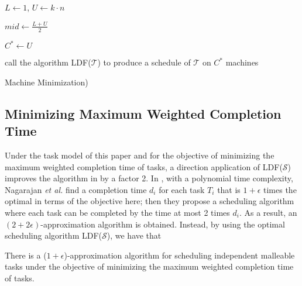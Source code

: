 \documentclass[10pt,journal,compsoc]{IEEEtran}
\begin{document}
\begin{algorithm}
\BlankLine
\BlankLine

$L\leftarrow 1$,  $U\leftarrow k\cdot n$

$mid\leftarrow \frac{L+U}{2}$\;


$C^{*}\leftarrow U$

call the algorithm LDF($\mathcal{T}$) to produce a schedule of $\mathcal{T}$ on $C^{*}$ machines\;



\caption{Machine Minimization)\label{minimization}}
\end{algorithm}








\subsection{Minimizing Maximum Weighted Completion Time}


Under the task model of this paper and for the objective of minimizing the maximum weighted completion time of tasks, a direction application of LDF($\mathcal{S}$) improves the algorithm in \cite{Nagarajan} by a factor 2. In \cite{Nagarajan}, with a polynomial time complexity, Nagarajan {\em et al.} find a completion time $d_{i}$ for each task $T_{i}$ that is $1+\epsilon$ times the optimal in terms of the objective here; then they propose a scheduling algorithm where each task can be completed by the time at most 2 times $d_{i}$. As a result, an $(2+2\epsilon)$-approximation algorithm is obtained. Instead, by using the optimal scheduling algorithm LDF($\mathcal{S}$), we have that
\begin{proposition}
There is a ($1+\epsilon$)-approximation algorithm for scheduling independent malleable tasks under the objective of minimizing the maximum weighted completion time of tasks.
\end{proposition}
\end{document}
